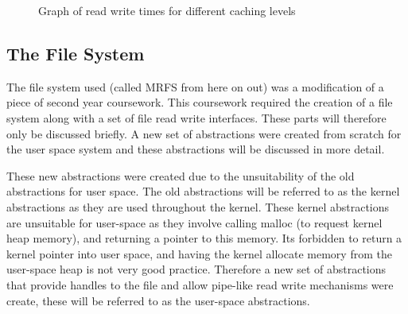 \documentclass[a4paper]{report}
\begin{document}
\begin{figure}[h!]
  \begin{center}
    \caption{Graph of read write times for different caching levels}
  \end{center}
\end{figure}



















\subsection{The File System}

The file system used (called MRFS from here on out) was a modification of a piece of second year coursework. This coursework required the creation of a file system along with a set of file read write interfaces. These parts will therefore only be discussed briefly. A new set of abstractions were created from scratch for the user space system and these abstractions will be discussed in more detail.

These new abstractions were created due to the unsuitability of the old abstractions for user space. The old abstractions will be referred to as the kernel abstractions as they are used throughout the kernel. These kernel abstractions are unsuitable for user-space as they involve calling malloc (to request kernel heap memory), and returning a pointer to this memory. Its forbidden to return a kernel pointer into user space, and having the kernel allocate memory from the user-space heap is not very good practice. Therefore a new set of abstractions that provide handles to the file and allow pipe-like read write mechanisms were create, these will be referred to as the user-space abstractions.
\end{document}

